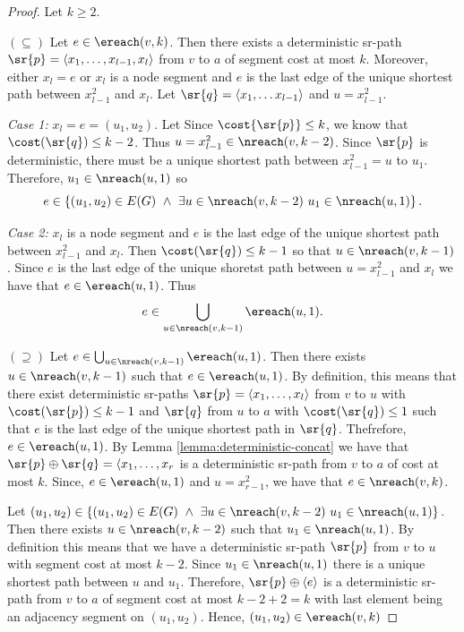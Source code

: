 \begin{proof}
Let $k \geq 2$. 

$(\subseteq)$ Let $e \in \ereach(v, k)$. Then there exists a deterministic sr-path 
$\sr{p} = \langle x_1, \ldots, x_{l - 1}, x_l \rangle$ from $v$ to 
$a$ of segment cost at most $k$. Moreover, either $x_l = e$ or $x_l$ is a node
segment and $e$ is the last edge of the unique shortest path between $x^2_{l - 1}$
and $x_{l}$. Let $\sr{q} = \langle x_1, \ldots x_{l - 1} \rangle$ and $u = x^2_{l - 1}$.

\emph{Case 1:} $x_l = e = (u_1, u_2)$. Let 
Since $\cost{\sr{p}} \leq k$, we know that
$\cost(\sr{q}) \leq k - 2$. Thus $u = x^2_{l - 1} \in \nreach(v, k - 2)$. 
Since $\sr{p}$ is deterministic, 
there must be a unique shortest path
between $x^2_{l - 1} = u$ to $u_1$. Therefore, $u_1 \in \nreach(u, 1)$ so
$$
e \in \left\{ (u_1, u_2) \in E(G) \ \wedge \ \exists u \in \nreach(v, k - 2) \ u_1 \in \nreach(u, 1) \right\}.
$$

\emph{Case 2:} $x_l$ is a node segment and $e$ is the last edge of the unique
shortest path between $x^2_{l - 1}$ and $x_l$. Then $\cost(\sr{q}) \leq k - 1$
so that $u \in \nreach(v, k - 1)$. Since $e$ is the last edge of the unique
shoretst path between $u = x^2_{l - 1}$ and $x_l$ we have that $e \in \ereach(u, 1)$.
Thus
$$
e \in \bigcup_{u \in \nreach(v, k - 1)} \ereach(u, 1).
$$

$(\supseteq)$ Let $e \in \bigcup_{u \in \nreach(v, k - 1)} \ereach(u, 1)$. Then
there exists $u \in \nreach(v, k - 1)$ such that $e \in \ereach(u, 1)$. By definition,
this means that there exist deterministic sr-paths $\sr{p} = \langle x_1, \ldots, x_l \rangle$
from $v$ to $u$ with $\cost(\sr{p}) \leq k - 1$ and $\sr{q}$
from $u$ to $a$ with $\cost(\sr{q}) \leq 1$ such that $e$ is the last
edge of the unique shortest path in $\sr{q}$. Thefrefore, $e \in \ereach(u, 1)$. By Lemma 
\ref{lemma:deterministic-concat} we have that $\sr{p} \oplus \sr{q} = \langle x_1, \ldots, x_r$ is a
deterministic sr-path from $v$ to $a$ of cost at most $k$. Since, $e \in \ereach(u, 1)$ and $u = x^2_{r - 1}$, 
we have that $e \in \nreach(v, k)$.

Let $(u_1, u_2) \in \left\{ (u_1, u_2) \in E(G) \ \wedge \ \exists u \in \nreach(v, k - 2) \ u_1 \in \nreach(u, 1) \right\}$.
Then there exists $u \in \nreach(v, k -2)$ such that $u_1 \in \nreach(u, 1)$. By definition this means that we have a
deterministic sr-path $\sr{p}$ from $v$ to $u$ with segment cost at most $k - 2$.
Since $u_1 \in \nreach(u, 1)$ there is a unique shortest path between $u$ and $u_1$.
Therefore, $\sr{p} \oplus \langle e \rangle$ is a deterministic sr-path
from $v$ to $a$ of segment cost at most $k - 2 + 2 = k$ with last element being an adjacency segment
on $(u_1, u_2)$. Hence, $(u_1, u_2) \in \ereach(v, k)$
\end{proof}

